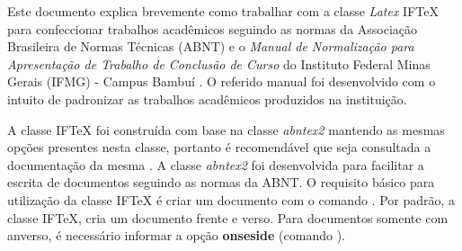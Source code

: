 Este documento explica brevemente como trabalhar com a classe \textit{Latex} {IF\TeX} para confeccionar trabalhos acadêmicos seguindo as normas da Associação Brasileira de Normas Técnicas (ABNT) e o \textit{Manual de Normalização para Apresentação de Trabalho de Conclusão de Curso} do Instituto Federal Minas Gerais (IFMG) - Campus Bambuí \cite{castro:2016:manual}.
O referido manual foi desenvolvido com o intuito de padronizar as trabalhos acadêmicos produzidos na instituição.

A classe {IF\TeX} foi construída com base na classe \textit{abntex2} mantendo as mesmas opções presentes nesta classe, portanto é recomendável que seja consultada a documentação da mesma \cite{araujo:2016:abntex2}.
A classe \textit{abntex2} foi desenvolvida para facilitar a escrita de documentos seguindo as normas da ABNT.
O requisito básico para utilização da classe {IF\TeX} é criar um documento com o comando .
Por padrão, a classe {IF\TeX}, cria um documento frente e verso.
Para documentos somente com anverso, é necessário informar a opção \textbf{onseside} (comando ).
